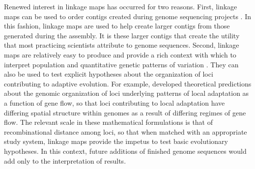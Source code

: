 \documentclass[11pt]{article}
\begin{document}
Renewed interest in linkage maps has occurred for two reasons. First, linkage maps can be used to order contigs 
created during genome sequencing projects \citep{Mackay:2012, Martinez-Garcia:2013}. In this fashion, linkage 
maps are used to help create larger contigs from those generated during the assembly. It is these larger contigs that 
create the utility that most practicing scientists attribute to genome sequences. Second, linkage maps are relatively 
easy to produce and provide a rich context with which to interpret population and quantitative genetic patterns of variation 
\citep[e.g.][]{Eckert:2010a, Eckert:2010b, Eckert:2013a, Yeaman:2013}. They can also be used to test explicit hypotheses about 
the organization of loci contributing to adaptive evolution. For example, \citet{Yeaman:2011} developed theoretical 
predictions about the genomic organization of loci underlying patterns of local adaptation as a function of gene flow, 
so that loci contributing to local adaptation have differing spatial structure within genomes as a result of differing 
regimes of gene flow. The relevant scale \citep[\textit{sensu}][]{Houle:2011} in these mathematical formulations is that 
of recombinational distance among loci, so that when matched with an appropriate study system, 
linkage maps provide the impetus to test basic evolutionary hypotheses. In this context, future additions of finished 
genome sequences would add only to the interpretation of results.
\end{document}
